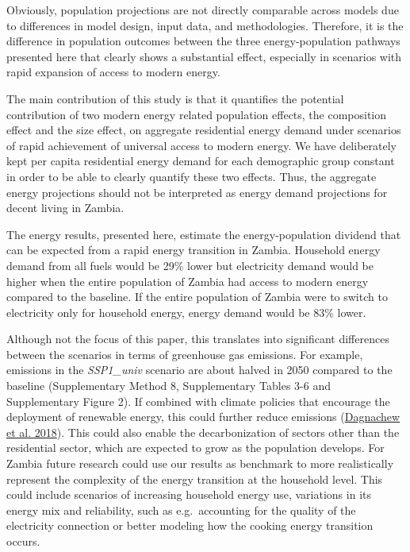 \documentclass[
]{article}
\begin{document}
Obviously, population projections are not directly comparable across models due to differences in model design, input data, and methodologies. Therefore, it is the difference in population outcomes between the three energy-population pathways presented here that clearly shows a substantial effect, especially in scenarios with rapid expansion of access to modern energy.

The main contribution of this study is that it quantifies the potential contribution of two modern energy related population effects, the composition effect and the size effect, on aggregate residential energy demand under scenarios of rapid achievement of universal access to modern energy. We have deliberately kept per capita residential energy demand for each demographic group constant in order to be able to clearly quantify these two effects. Thus, the aggregate energy projections should not be interpreted as energy demand projections for decent living in Zambia.

The energy results, presented here, estimate the energy-population dividend that can be expected from a rapid energy transition in Zambia. Household energy demand from all fuels would be 29\% lower but electricity demand would be higher when the entire population of Zambia had access to modern energy compared to the baseline. If the entire population of Zambia were to switch to electricity only for household energy, energy demand would be 83\% lower.

Although not the focus of this paper, this translates into significant differences between the scenarios in terms of greenhouse gas emissions. For example, emissions in the \emph{SSP1\_univ} scenario are about halved in 2050 compared to the baseline (Supplementary Method 8, Supplementary Tables 3-6 and Supplementary Figure 2). If combined with climate policies that encourage the deployment of renewable energy, this could further reduce emissions (\protect\hyperlink{ref-dagnachew_trade-offs_2018}{Dagnachew et al. 2018}). This could also enable the decarbonization of sectors other than the residential sector, which are expected to grow as the population develops.
For Zambia future research could use our results as benchmark to more realistically represent the complexity of the energy transition at the household level. This could include scenarios of increasing household energy use, variations in its energy mix and reliability, such as e.g.~accounting for the quality of the electricity connection or better modeling how the cooking energy transition occurs.
\end{document}
